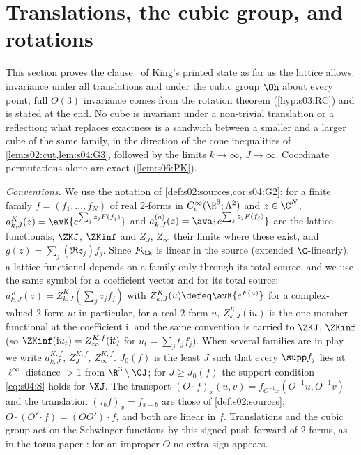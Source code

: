 \section{Translations, the cubic group, and rotations}

This section proves the clause \OSo\ of King's printed state as far as the lattice allows: invariance under all translations and under the cubic group $\Oh$ about every point; full $O(3)$ invariance comes from the rotation theorem (\cref{hyp:s03:RC}) and is stated at the end. No cube is invariant under a non-trivial translation or a reflection; what replaces exactness is a sandwich between a smaller and a larger cube of the same family, in the direction of the cone inequalities of \cref{lem:s02:cut,lem:s04:G3}, followed by the limits $k\to\infty$, $J\to\infty$. Coordinate permutations alone are exact (\cref{lem:s06:PK}).

\emph{Conventions.} We use the notation of \cref{def:s02:sources,cor:s04:G2}: for a finite family $f=(f_1,\dots,f_N)$ of real $2$-forms in $C^\infty_c(\R^3;\Lambda^2)$ and $z\in\C^N$, $a^K_{k,J}(z)=\avK{e^{\sum_jz_jF(f_j)}}$ and $a^{(a)}_{k,J}(z)=\ava{e^{\sum_jz_jF(f_j)}}$ are the lattice functionals, $\ZKJ$, $\ZKinf$ and $Z_J$, $Z_\infty$ their limits where these exist, and $g(z)=\sum_j(\Re z_j)f_j$. Since $F_{\Lk}$ is linear in the source (extended $\C$-linearly), a lattice functional depends on a family only through its total source, and we use the same symbol for a coefficient vector and for its total source: $a^K_{k,J}(z)=Z^K_{k,J}(\sum_jz_jf_j)$ with $Z^K_{k,J}(u)\defeq\avK{e^{F(u)}}$ for a complex-valued $2$-form $u$; in particular, for a real $2$-form $u$, $Z^K_{k,J}(\mathrm iu)$ is the one-member functional at the coefficient $\mathrm i$, and the same convention is carried to $\ZKJ$, $\ZKinf$ (so $\ZKinf(\mathrm iu_t)=Z^{K,f}_\infty(\mathrm it)$ for $u_t=\sum_jt_jf_j$). When several families are in play we write $a^{K,f}_{k,J}$, $Z^{K,f}_J$, $Z^{K,f}_\infty$. $J_0(f)$ is the least $J$ such that every $\supp f_j$ lies at $\ell^\infty$-distance $>1$ from $\R^3\setminus\CJ$; for $J\ge J_0(f)$ the support condition \eqref{eq:s04:S} holds for $\XJ$. The transport $(O\cdot f)_x(u,v)=f_{O^{-1}x}(O^{-1}u,O^{-1}v)$ and the translation $(\tau_bf)_x=f_{x-b}$ are those of \cref{def:s02:sources}; $O\cdot(O'\cdot f)=(OO')\cdot f$, and both are linear in $f$. Translations and the cubic group act on the Schwinger functions by this signed push-forward of $2$-forms, as in the torus paper \cite{SymPhase}: for an improper $O$ no extra sign appears.

